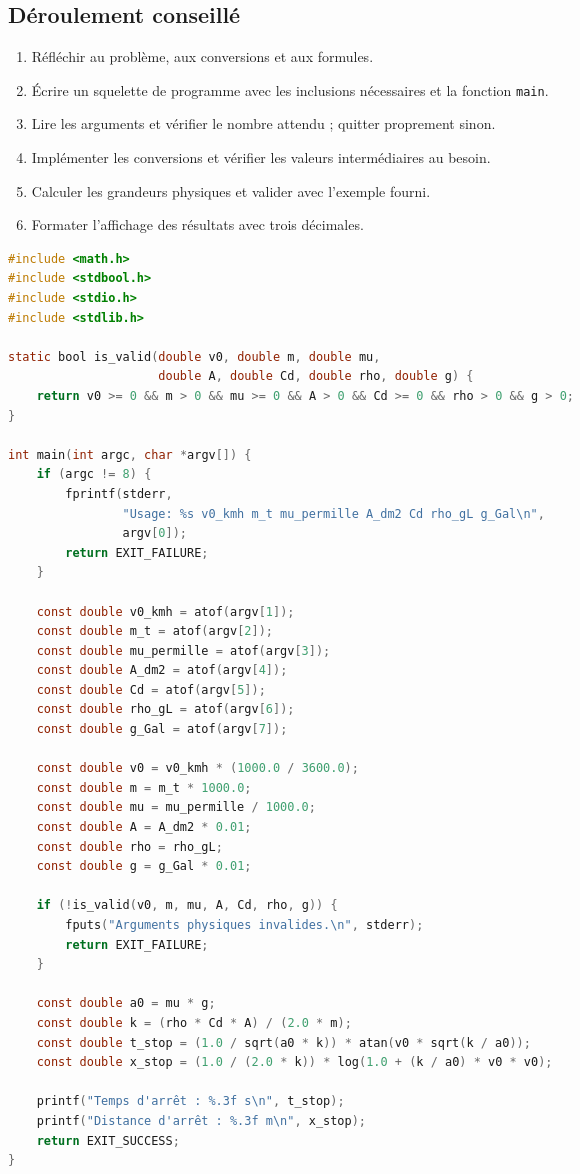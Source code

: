 \documentclass[french,a4paper,addpoints,11pt]{exam}
\begin{document}
\begin{multicols}{2}
\begin{questions}
        \section*{Déroulement conseillé}
        \begin{enumerate}
            \item Réfléchir au problème, aux conversions et aux formules.
            \item Écrire un squelette de programme avec les inclusions nécessaires et la fonction \texttt{main}.
            \item Lire les arguments et vérifier le nombre attendu ; quitter proprement sinon.
            \item Implémenter les conversions et vérifier les valeurs intermédiaires au besoin.
            \item Calculer les grandeurs physiques et valider avec l'exemple fourni.
            \item Formater l'affichage des résultats avec trois décimales.
        \end{enumerate}

        \begin{solution}
\begin{lstlisting}[language=C]
#include <math.h>
#include <stdbool.h>
#include <stdio.h>
#include <stdlib.h>

static bool is_valid(double v0, double m, double mu,
                     double A, double Cd, double rho, double g) {
    return v0 >= 0 && m > 0 && mu >= 0 && A > 0 && Cd >= 0 && rho > 0 && g > 0;
}

int main(int argc, char *argv[]) {
    if (argc != 8) {
        fprintf(stderr,
                "Usage: %s v0_kmh m_t mu_permille A_dm2 Cd rho_gL g_Gal\n",
                argv[0]);
        return EXIT_FAILURE;
    }

    const double v0_kmh = atof(argv[1]);
    const double m_t = atof(argv[2]);
    const double mu_permille = atof(argv[3]);
    const double A_dm2 = atof(argv[4]);
    const double Cd = atof(argv[5]);
    const double rho_gL = atof(argv[6]);
    const double g_Gal = atof(argv[7]);

    const double v0 = v0_kmh * (1000.0 / 3600.0);
    const double m = m_t * 1000.0;
    const double mu = mu_permille / 1000.0;
    const double A = A_dm2 * 0.01;
    const double rho = rho_gL;
    const double g = g_Gal * 0.01;

    if (!is_valid(v0, m, mu, A, Cd, rho, g)) {
        fputs("Arguments physiques invalides.\n", stderr);
        return EXIT_FAILURE;
    }

    const double a0 = mu * g;
    const double k = (rho * Cd * A) / (2.0 * m);
    const double t_stop = (1.0 / sqrt(a0 * k)) * atan(v0 * sqrt(k / a0));
    const double x_stop = (1.0 / (2.0 * k)) * log(1.0 + (k / a0) * v0 * v0);

    printf("Temps d'arrêt : %.3f s\n", t_stop);
    printf("Distance d'arrêt : %.3f m\n", x_stop);
    return EXIT_SUCCESS;
}
\end{lstlisting}
        \end{solution}
    \end{questions}
        \end{multicols}
\end{document}
